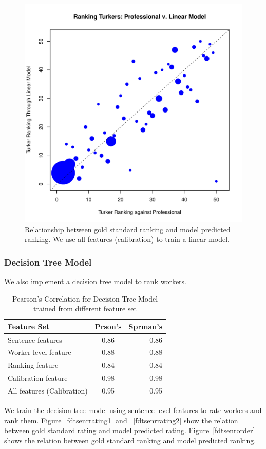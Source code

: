 \documentclass[11pt]{article}
\begin{document}
\begin{figure}[htbp]
  \centering
  \includegraphics[width=\linewidth]{AllFeatureWithCali/allfeaturewithcaliorderlm.pdf}
  \caption{Relationship between gold standard ranking and model predicted ranking. We use all features (calibration) to train a linear model. }
    \label{flmallcaliorder}
\end{figure}

\subsubsection{Decision Tree Model}
We also implement a decision tree model to rank workers.
\begin{table}[htbp]
\begin{center}
\begin{tabular}{| l | c | r |}
\hline \bf Feature Set & \bf Prson's  &\bf Sprman's  \\ \hline
Sentence features & 0.86& 0.86 \\
Worker level feature & 0.88  & 0.88 \\
Ranking feature & 0.84 & 0.84 \\
Calibration feature & 0.98& 0.98\\
All features (Calibration)& 0.95 & 0.95 \\
\hline
\end{tabular}
\end{center}
\caption{\label{tdtpearson} Pearson's Correlation for Decision Tree Model trained from different feature set }
\end{table}
We train the decision tree model using sentence level features to rate workers and rank them. Figure~\ref{fdtsenrrating1} and ~\ref{fdtsenrrating2} show the relation between gold standard rating and model predicted rating. Figure~\ref{fdtsenrorder} shows the relation between gold standard ranking and model predicted ranking.
\end{document}
